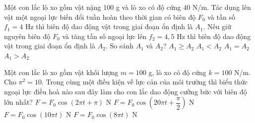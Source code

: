 \begin{ex}%
Một con lắc lò xo gồm vật nặng 100 g và lò xo có độ cứng 40 N/m. Tác dụng lên vật một ngoại lực biến đổi tuần hoàn theo thời gian có biên độ $F_0$ và tần số $f_1= 4$ Hz thì biên độ dao động vật trong giai đoạn ổn định là $A_1$. Nếu giữ nguyên biên độ $F_0$ và tăng tần số ngoại lực lên $f_2 = 4,5$ Hz thì biên độ dao động vật trong giai đoạn ổn định là $A_2$. So sánh $A_1$ và $A_2$?
\choice
{$A_1\ge A_2$}
{$A_1<A_2$}
{$A_1=A_2$}
{\True $A_1>A_2$}
\end{ex} 

\begin{ex}%
Một con lắc lò xo gồm vật khối lượng $m = 100$  g, lò xo có độ cứng $k = 100$ N/m.  Cho $\pi^2 = 10$.  Trong cùng một điều kiện về lực cản của môi trường thì biểu thức ngoại lực điều hoà nào sau đây làm cho con lắc dao động cưỡng bức với biên độ lớn nhất?
\choice
{$F = F_0\cos (2\pi t + \pi )$ N}
{$F = F_0\cos (20\pi t + \dfrac{\pi}{2})$ N}
{\True $F = F_0\cos (10\pi t)$ N}
{$F = F_0\cos (8\pi t)$ N}
\end{ex} 

